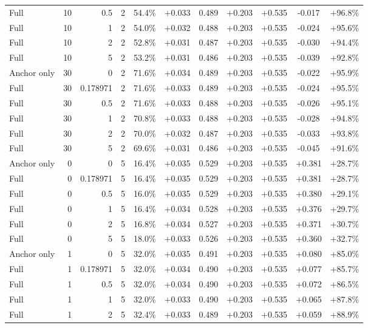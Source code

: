 \begin{table}[htbp]
\begin{tabular}{lrrrccccccc}
Full & 10 & 0.5 & 2 & 54.4\% & +0.033 & 0.489 & +0.203 & +0.535 & -0.017 & +96.8\% \\
Full & 10 & 1 & 2 & 54.0\% & +0.032 & 0.488 & +0.203 & +0.535 & -0.024 & +95.6\% \\
Full & 10 & 2 & 2 & 52.8\% & +0.031 & 0.487 & +0.203 & +0.535 & -0.030 & +94.4\% \\
Full & 10 & 5 & 2 & 53.2\% & +0.031 & 0.486 & +0.203 & +0.535 & -0.039 & +92.8\% \\
Anchor only & 30 & 0 & 2 & 71.6\% & +0.034 & 0.489 & +0.203 & +0.535 & -0.022 & +95.9\% \\
Full & 30 & 0.178971 & 2 & 71.6\% & +0.033 & 0.489 & +0.203 & +0.535 & -0.024 & +95.5\% \\
Full & 30 & 0.5 & 2 & 71.6\% & +0.033 & 0.488 & +0.203 & +0.535 & -0.026 & +95.1\% \\
Full & 30 & 1 & 2 & 70.8\% & +0.033 & 0.488 & +0.203 & +0.535 & -0.028 & +94.8\% \\
Full & 30 & 2 & 2 & 70.0\% & +0.032 & 0.487 & +0.203 & +0.535 & -0.033 & +93.8\% \\
Full & 30 & 5 & 2 & 69.6\% & +0.031 & 0.486 & +0.203 & +0.535 & -0.045 & +91.6\% \\
Anchor only & 0 & 0 & 5 & 16.4\% & +0.035 & 0.529 & +0.203 & +0.535 & +0.381 & +28.7\% \\
Full & 0 & 0.178971 & 5 & 16.4\% & +0.035 & 0.529 & +0.203 & +0.535 & +0.381 & +28.7\% \\
Full & 0 & 0.5 & 5 & 16.0\% & +0.035 & 0.529 & +0.203 & +0.535 & +0.380 & +29.1\% \\
Full & 0 & 1 & 5 & 16.4\% & +0.034 & 0.528 & +0.203 & +0.535 & +0.376 & +29.7\% \\
Full & 0 & 2 & 5 & 16.8\% & +0.034 & 0.527 & +0.203 & +0.535 & +0.371 & +30.7\% \\
Full & 0 & 5 & 5 & 18.0\% & +0.033 & 0.526 & +0.203 & +0.535 & +0.360 & +32.7\% \\
Anchor only & 1 & 0 & 5 & 32.0\% & +0.035 & 0.491 & +0.203 & +0.535 & +0.080 & +85.0\% \\
Full & 1 & 0.178971 & 5 & 32.0\% & +0.034 & 0.490 & +0.203 & +0.535 & +0.077 & +85.7\% \\
Full & 1 & 0.5 & 5 & 32.0\% & +0.034 & 0.490 & +0.203 & +0.535 & +0.072 & +86.5\% \\
Full & 1 & 1 & 5 & 32.0\% & +0.033 & 0.490 & +0.203 & +0.535 & +0.065 & +87.8\% \\
Full & 1 & 2 & 5 & 32.4\% & +0.033 & 0.489 & +0.203 & +0.535 & +0.059 & +88.9\% \\

\end{tabular}
\end{table}
